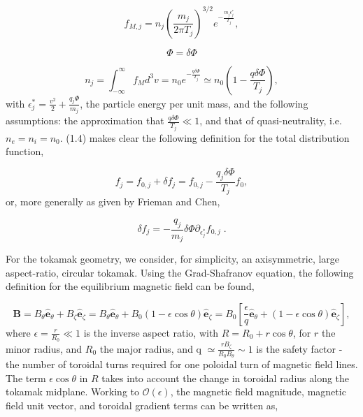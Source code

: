 \documentclass[12pt]{article}
\numberwithin{equation}{section}
\begin{document}
   \begin{equation}
      f_{M,j} = n_j\left(\frac{m_j}{2\pi T_j}\right)^{3/2}e^{-\frac{m_j \epsilon^*_j}{T_j}},
   \end{equation}
   
   \begin{equation}
      \Phi = \delta\Phi
   \end{equation}
   
   \begin{equation}
      n_j = \int_{-\infty}^{\infty}f_M d^{3}v = n_0e^{-\frac{q\delta\Phi}{T_j}} \simeq n_0(1-\frac{q\delta\Phi}{T_j}),
   \end{equation}
with $\epsilon^*_j = \frac{v^2}{2} + \frac{q_j\Phi}{m_j}$, the particle energy per unit mass, and the following assumptions:
the approximation that $\frac{q\delta\Phi}{T_j} \ll 1$, and that of quasi-neutrality, i.e. $n_e = n_i = n_0$. (1.4) makes
clear the following definition for the total distribution function,

   \begin{equation}
      f_j = f_{0,j} + \delta f_j = f_{0,j} - \frac{q_j\delta\Phi}{T_j}f_0,
   \end{equation}
or, more generally as given by Frieman and Chen\cite{FriemanChen},

   \begin{equation}
      \delta f_j = -\frac{q_j}{m_j}\delta\Phi\partial_{\epsilon^*_j}f_{0,j}\;.
   \end{equation}
   
   \quad For the tokamak geometry, we consider, for simplicity, an axisymmetric, large aspect-ratio, circular tokamak.
Using the Grad-Shafranov equation, the following definition for the equilibrium magnetic field can be found,

   \begin{equation}
      \bm{B} = B_\theta\bm{\hat{e}}_\theta + B_\zeta\bm{\hat{e}}_\zeta =
               B_\theta\bm{\hat{e}}_\theta + B_0(1-\epsilon\cos\theta)\bm{\hat{e}}_\zeta =
               B_0[\frac{\epsilon}{q}\bm{\hat{e}}_\theta + (1-\epsilon\cos\theta)\bm{\hat{e}}_\zeta],
   \end{equation}
where $\epsilon=\frac{r}{R_0} \ll 1$ is the inverse aspect ratio, with $R=R_0+r\cos\theta$, for $r$ the minor radius,
and $R_0$ the major radius, and q $\simeq\frac{rB_\zeta}{R_0B_\theta}\sim1$ is the safety factor - the number of
toroidal turns required for one poloidal turn of magnetic field lines. The term $\epsilon\cos\theta$ in $R$ takes into
account the change in toroidal radius along the tokamak midplane. Working to $\mathcal{O}(\epsilon)$, the magnetic field
magnitude, magnetic field unit vector, and toroidal gradient terms can be written as,
   
\end{document}
